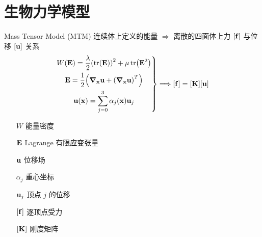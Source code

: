 \documentclass{beamer}
\begin{document}
\section{生物力学模型}

\begin{frame}{Mass Tensor Model (MTM)}
  连续体上定义的能量 $\Longrightarrow$ 离散的四面体上力 $\bqty{\vb{f}}$ 与位移 $\bqty{\vb{u}}$ 关系
  \begin{equation*}
    \left.
    \begin{gathered}
      W(\vb{E}) = \frac{\lambda}{2} \pqty{\tr(\vb{E})}^2 + \mu \tr(\vb{E}^2) \\
      \vb{E} = \frac{1}{2} \pqty{\grad_{\vb{x}}{\vb{u}} + \pqty{\grad_{\vb{x}}{\vb{u}}}^T}               \\
      \vb{u}(\vb{x}) = \sum_{j = 0}^3 \alpha_j(\vb{x}) \vb{u}_j
    \end{gathered}
    \right\}
    \Longrightarrow[\vb{f}] = [\vb{K}] [\vb{u}]
  \end{equation*}
  \begin{multicols}{3}
    \begin{itemize}
      \item[$W$] 能量密度
      \item[$\vb{E}$] Lagrange 有限应变张量
      \item[$\vb{u}$] 位移场
      \item[$\alpha_j$] 重心坐标
      \item[$\vb{u}_j$] 顶点 $j$ 的位移
      \item[$\bqty{\vb{f}}$] 逐顶点受力
      \item[$\bqty{\vb{K}}$] 刚度矩阵
    \end{itemize}
  \end{multicols}
\end{frame}
\end{document}
